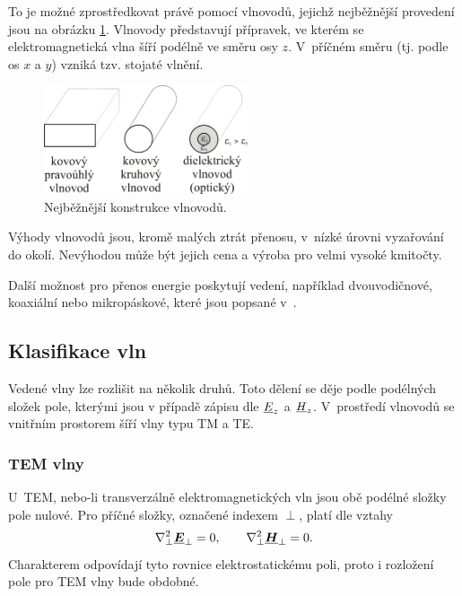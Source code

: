 To je možné zprostředkovat právě pomocí vlnovodů, jejichž nejběžnější provedení jsou na obrázku \ref{obr:evlny_vlnovody}. Vlnovody představují přípravek, ve kterém se elektromagnetická vlna šíří podélně ve směru osy $z$. V~příčném směru (tj. podle os $x$ a $y$) vzniká tzv. stojaté vlnění.
\begin{figure}[!h]
	\centering
	\includegraphics[width=6cm]{evlny_vlnovody.png}
	\caption{Nejběžnější konstrukce vlnovodů. \cite{emp}}
	\label{obr:evlny_vlnovody}
\end{figure}
Výhody vlnovodů jsou, kromě malých ztrát přenosu, v~nízké úrovni vyzařování do okolí. Nevýhodou může být jejich cena a výroba pro velmi vysoké kmitočty. 

Další možnost pro přenos energie poskytují vedení, například dvouvodičnové, koaxiální nebo mikropáskové, které jsou popsané v~\cite{emp}.

\subsection{Klasifikace vln}
Vedené vlny lze rozlišit na několik druhů. Toto dělení se děje podle podélných složek pole, kterými jsou v případě zápisu dle \cite{emp} ${\underline{E}}_{z}$ a ${\underline{H}}_{z}$. V~prostředí vlnovodů se vnitřním prostorem šíří vlny typu TM a TE.

\subsubsection*{TEM vlny}
U~TEM, nebo-li transverzálně elektromagnetických vln jsou obě podélné složky pole nulové. Pro příčné složky, označené indexem $\perp$, platí dle \cite{emp} vztahy
\begin{displaymath}
	\nabla^{2}_{\perp} \mbox{\underline{\boldmath$E$}}_{\perp} = 0,\qquad\nabla^{2}_{\perp} \mbox{\underline{\boldmath$H$}}_{\perp} = 0.
\end{displaymath}
Charakterem odpovídají tyto rovnice elektrostatickému poli, proto i rozložení pole pro TEM vlny bude obdobné.

